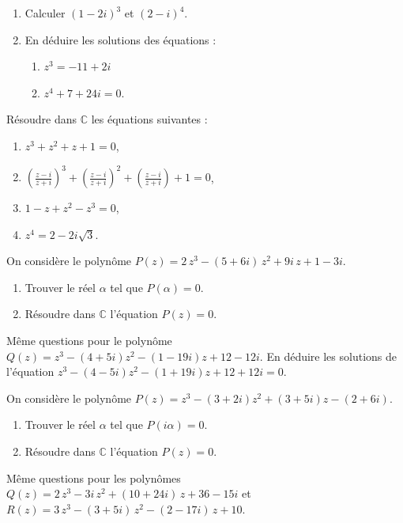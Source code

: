 %
\begin{exo}
      \begin{enumerate}
            \item Calculer $(1-2i)^3$ et $(2-i)^4$.
            \item En d\'eduire les solutions des \'equations : 
                  \begin{enumerate}
                        \item $z^3 = - 11 + 2i$
                        \item $z^4 + 7 + 24 i = 0$.
                  \end{enumerate}
      \end{enumerate}
\end{exo}
%
\begin{exo}
      R\'esoudre dans $\mathbb{C}$ les \'equations suivantes : 
      \begin{enumerate}
            \item $z^3 + z^2 + z + 1 = 0$,
            \item $\left(\frac{z-i}{z+i}\right)^3+\left(\frac{z-i}{z+i}\right)^2+\left(\frac{z-i}{z+i}\right)+1 = 0$,
            \item $1-z+z^2-z^3 = 0$,
            \item $z^4 = 2 - 2 i \sqrt{3}$.
      \end{enumerate}
\end{exo}
%
\begin{exo}
      On consid\`ere le polyn\^ome $P(z) = 2\, z^3 - (5+6i)\, z^2 + 9i\, z + 1 - 3i$.
      \begin{enumerate}
            \item Trouver le r\'eel $\alpha$ tel que $P(\alpha) = 0$.
            \item R\'esoudre dans $\mathbb{C}$ l'\'equation $P(z) = 0$.
      \end{enumerate}
      M\^eme questions pour le polyn\^ome $Q(z) = z^3 - (4+5i) z^2 - (1-19i) z + 12 - 12 i$.
      En d\'eduire les solutions de l'\'equation $z^3 - (4-5i) z^2 - (1+19i) z + 12 + 12 i = 0 $.
\end{exo}
%
\begin{exo}
      On consid\`ere le polyn\^ome $P(z) = z^3 - (3+2i)z^2 + (3+5i) z - (2+6i)$.
      \begin{enumerate}
            \item Trouver le r\'eel $\alpha$ tel que $P(i\alpha) = 0$.
            \item R\'esoudre dans $\mathbb{C}$ l'\'equation $P(z) = 0$.
      \end{enumerate}
      M\^eme questions pour les polyn\^omes
      $Q(z) = 2 \, z^{3} - 3 i \, z^{2} + \left(10 + 24 i\right) \, z + 36 - 15 i$
      et 
      $R(z) = 3 \, z^{3} - \left(3 + 5 i\right) \, z^{2} - \left(2 - 17 i\right) \, z + 10$.
\end{exo}
